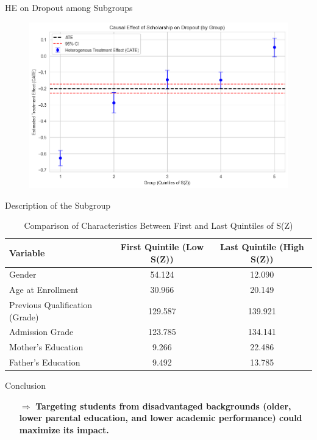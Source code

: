 \documentclass[aspectratio=169]{beamer}
\begin{document}
\begin{frame}{HE on Dropout among Subgroups}

\begin{figure}[h]  
        \includegraphics[width=0.9\linewidth]{Tex_Pictures/HE_quintile_dropout.png}

 \end{figure}   
\end{frame}



\begin{frame}{Description of the Subgroup}
\begin{table}[h]
    \centering
    \begin{tabular}{l c c}
        \hline
        \textbf{Variable} & \textbf{First Quintile (Low S(Z))} & \textbf{Last Quintile (High S(Z))} \\
        \hline
        Gender & 54.124 & 12.090 \\
        Age at Enrollment & 30.966 & 20.149 \\
        Previous Qualification (Grade) & 129.587 & 139.921 \\
        Admission Grade & 123.785 & 134.141 \\
        Mother’s Education & 9.266 & 22.486 \\
        Father’s Education & 9.492 & 13.785 \\
        \hline
    \end{tabular}
    \caption{Comparison of Characteristics Between First and Last Quintiles of S(Z)}
    \label{tab:quintile_comparison}
\end{table}


 \begin{exampleblock}{Conclusion}
\vspace{-1pt}
\begin{itemize}
    \item [$\Rightarrow$]
 \textbf{Targeting students from disadvantaged backgrounds (older, lower parental education, and lower academic performance) could maximize its impact.}
\end{itemize}
\vspace{-3pt}
	
\end{exampleblock}


\end{frame}
\end{document}
